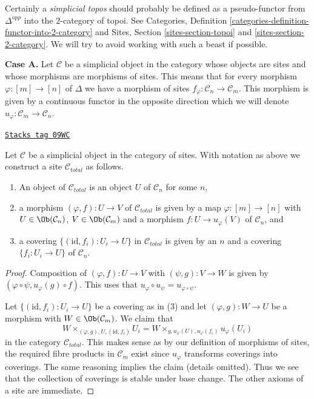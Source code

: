 \medskip\noindent
Certainly a {\it simplicial topos} should probably be defined as a
pseudo-functor from $\Delta^{opp}$ into the $2$-category of topoi.
See Categories, Definition \ref{categories-definition-functor-into-2-category}
and Sites, Section \ref{sites-section-topoi} and
\ref{sites-section-2-category}. We will try to avoid working with such
a beast if possible.

\medskip\noindent
{\bf Case A.}
Let $\mathcal{C}$ be a simplicial object in the category whose objects
are sites and whose morphisms are morphisms of sites. This means that
for every morphism $\varphi : [m] \to [n]$ of $\Delta$ we have a morphism
of sites $f_\varphi : \mathcal{C}_n \to \mathcal{C}_m$. This morphism is
given by a continuous functor in the opposite direction which we will denote
$u_\varphi : \mathcal{C}_m \to \mathcal{C}_n$.

\begin{lemma}
\label{spaces-simplicial-lemma-simplicial-site-site}
\href{https://stacks.math.columbia.edu/tag/09WC}{\texttt{Stacks tag 09WC}}

Let $\mathcal{C}$ be a simplicial object in the category of sites.
With notation as above we construct a site $\mathcal{C}_{total}$ as follows.
\begin{enumerate}
\item An object of $\mathcal{C}_{total}$ is an object $U$ of
$\mathcal{C}_n$ for some $n$,
\item a morphism $(\varphi, f) : U \to V$ of $\mathcal{C}_{total}$
is given by a map $\varphi : [m] \to [n]$ with
$U \in \Ob(\mathcal{C}_n)$, $V \in \Ob(\mathcal{C}_m)$
and a morphism $f : U \to u_\varphi(V)$ of $\mathcal{C}_n$, and
\item a covering $\{(\text{id}, f_i) :  U_i \to U\}$ in $\mathcal{C}_{total}$
is given by an $n$ and a covering $\{f_i : U_i \to U\}$
of $\mathcal{C}_n$.
\end{enumerate}
\end{lemma}

\begin{proof}
Composition of $(\varphi, f) : U \to V$ with $(\psi, g) : V \to W$
is given by $(\varphi \circ \psi, u_\varphi(g) \circ f)$.
This uses that $u_\varphi \circ u_\psi = u_{\varphi \circ \psi}$.

\medskip\noindent
Let $\{(\text{id}, f_i) :  U_i \to U\}$ be a covering as in (3)
and let $(\varphi, g) : W \to U$ be a morphism with
$W \in \Ob(\mathcal{C}_m)$. We claim that
$$
W \times_{(\varphi, g), U, (\text{id}, f_i)} U_i =
W \times_{g, u_\varphi(U), u_\varphi(f_i)} u_\varphi(U_i)
$$
in the category $\mathcal{C}_{total}$. This makes sense as by our
definition of morphisms of sites, the required fibre products
in $\mathcal{C}_m$ exist since $u_\varphi$ transforms coverings into
coverings. The same reasoning implies the claim (details omitted).
Thus we see that the collection of coverings is stable under base
change. The other axioms of a site are immediate.
\end{proof}

